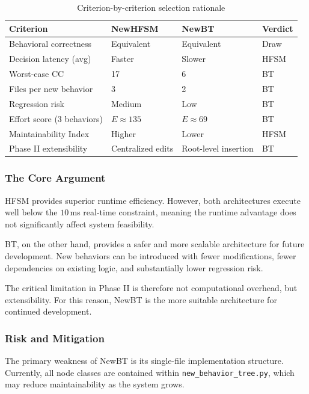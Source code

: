 \documentclass[12pt, a4paper]{report}
\begin{document}
\begin{table}[H]
\centering
\caption{Criterion-by-criterion selection rationale}
\label{tab:selection_rationale}
\begin{tabular}{@{}llll@{}}
\toprule
\textbf{Criterion} & \textbf{NewHFSM} & \textbf{NewBT} & \textbf{Verdict} \\
\midrule
Behavioral correctness & Equivalent & Equivalent & Draw \\
Decision latency (avg) & Faster & Slower & HFSM \\
Worst-case CC & 17 & 6 & BT \\
Files per new behavior & 3 & 2 & BT \\
Regression risk & Medium & Low & BT \\
Effort score (3 behaviors) & $E \approx 135$ & $E \approx 69$ & BT \\
Maintainability Index & Higher & Lower & HFSM \\
Phase II extensibility & Centralized edits & Root-level insertion & BT \\
\bottomrule
\end{tabular}
\end{table}

\subsubsection{The Core Argument}

HFSM provides superior runtime efficiency. However, both architectures execute well below the $10$\,ms real-time constraint, meaning the runtime advantage does not significantly affect system feasibility.

BT, on the other hand, provides a safer and more scalable architecture for future development. New behaviors can be introduced with fewer modifications, fewer dependencies on existing logic, and substantially lower regression risk.

The critical limitation in Phase II is therefore not computational overhead, but extensibility. For this reason, NewBT is the more suitable architecture for continued development.

\subsubsection{Risk and Mitigation}

The primary weakness of NewBT is its single-file implementation structure. Currently, all node classes are contained within \texttt{new\_behavior\_tree.py}, which may reduce maintainability as the system grows.
\end{document}
